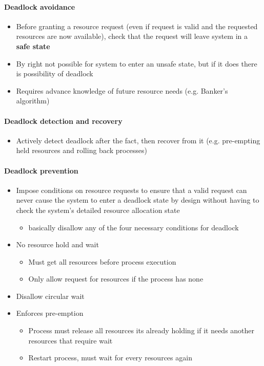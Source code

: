 \documentclass[a4paper]{article}
\begin{document}
\paragraph{Deadlock avoidance}
\begin{itemize}
	\item Before granting a resource request (even if request is valid and the requested resources are now available), check that the request will leave system in a \textbf{safe state}
	\item By right not possible for system to enter an unsafe state, but if it does there is possibility of deadlock
	\item Requires advance knowledge of future resource needs (e.g. Banker’s algorithm)
\end{itemize}
\paragraph{Deadlock detection and recovery}
\begin{itemize}
	\item Actively detect deadlock after the fact, then recover from it (e.g. pre-empting held resources and rolling back processes)
\end{itemize}
\paragraph{Deadlock prevention}
\begin{itemize}
	\item Impose conditions on resource requests to ensure that a valid request can never cause the system to enter a deadlock state by design without having to check the system's detailed resource allocation state
	\begin{itemize}[label=$\circ$]
		\item basically disallow any of the four necessary conditions for deadlock
	\end{itemize}
	\item No resource hold and wait
	\begin{itemize}[label=$\circ$]
		\item Must get all resources before process execution
		\item Only allow request for resources if the process has none
	\end{itemize}
	\item Disallow circular wait
	\item Enforces pre-emption
	\begin{itemize}[label=$\circ$]
		\item Process must release all resources its already holding if it needs another resources that require wait
		\item Restart process, must wait for every resources again
	\end{itemize}
\end{itemize}
\end{document}
